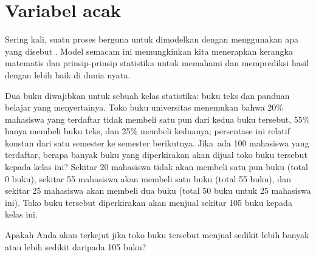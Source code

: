 {\setlength{\eoceAfterSpace}{2mm}}





\section{Variabel acak}
\label{randomVariablesSection}


\noindent%
Sering kali, suatu proses berguna untuk dimodelkan dengan menggunakan apa yang
disebut .
Model semacam ini memungkinkan kita menerapkan kerangka
matematis dan prinsip-prinsip statistika untuk
memahami dan memprediksi hasil dengan lebih baik
di dunia nyata.

\begin{examplewrap}
\begin{nexample}{Dua buku diwajibkan untuk sebuah kelas statistika: buku teks dan panduan belajar yang menyertainya. Toko buku universitas menemukan bahwa 20\% mahasiswa yang terdaftar tidak membeli satu pun dari kedua buku tersebut, 55\% hanya membeli buku teks, dan 25\% membeli keduanya; persentase ini relatif konstan dari satu semester ke semester berikutnya. Jika~ada 100 mahasiswa yang terdaftar, berapa banyak buku yang diperkirakan akan dijual toko buku tersebut kepada kelas ini?}\label{bookStoreSales}
Sekitar 20 mahasiswa tidak akan membeli satu pun buku (total 0 buku), sekitar 55 mahasiswa akan membeli satu buku (total 55 buku), dan sekitar 25 mahasiswa akan membeli dua buku (total 50 buku untuk 25 mahasiswa ini). Toko buku tersebut diperkirakan akan menjual sekitar 105 buku kepada kelas ini.
\end{nexample}
\end{examplewrap}

\begin{exercisewrap}
\begin{nexercise}
Apakah Anda akan terkejut jika toko buku tersebut menjual sedikit lebih banyak atau lebih sedikit daripada 105 buku?\footnotemark
\end{nexercise}
\end{exercisewrap}

